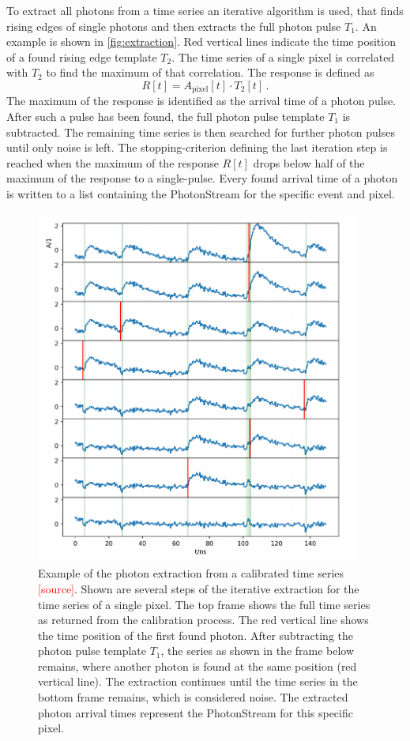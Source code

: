 To extract all photons from a time series an iterative algorithm is used, that
finds rising edges of single photons and then extracts the full photon pulse
$T_1$. An example is shown in \autoref{fig:extraction}. Red vertical lines
indicate the time position of a found rising edge template $T_2$. The time
series of a single pixel is correlated with $T_2$ to find the maximum of that
correlation. The response is defined as
%
\begin{equation}
  R[t] = A_\text{pixel}[t]\cdot T_2[t] \, .
\end{equation}
%
The maximum of the response is identified as the arrival time of a photon pulse.
After such a pulse has been found, the full photon pulse template $T_1$ is
subtracted. The remaining time series is then searched for further photon
pulses until only noise is left. The stopping-criterion defining the last
iteration step is reached when the maximum of the response $R[t]$ drops below
half of the maximum of the response to a single-pulse.
Every found arrival time of a photon is written to a list containing the
PhotonStream for the specific event and pixel.
%
\begin{figure}
  \centering
  \includegraphics[width=0.95\textwidth]{Plots/photon_extraction_sebastian.png}
  \caption{Example of the photon extraction from a calibrated time series \textcolor{red}{[source]}. Shown are several steps of the iterative extraction for the time series of a single pixel. The top frame shows the full time series as returned from the calibration process. The red vertical line shows the time position of the first found photon. After subtracting the photon pulse template $T_1$, the series as shown in the frame below remains, where another photon is found at the same position (red vertical line). The extraction continues until the time series in the bottom frame remains, which is considered noise. The extracted photon arrival times represent the PhotonStream for this specific pixel.}
  \label{fig:extraction}
\end{figure}
%
